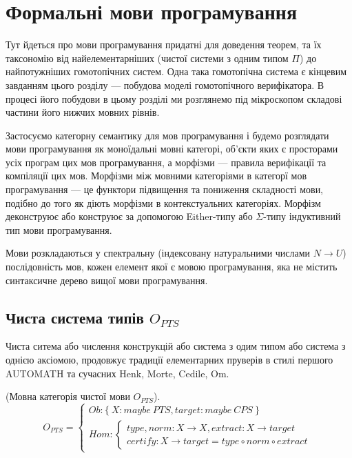 \section{Формальні мови програмування}
Тут йдеться про мови програмування придатні для доведення теорем,
та їх таксономію від найелементарніших (чистої системи з одним типом $\Pi$) до
найпотужніших гомотопічних систем. Одна така гомотопічна система є кінцевим завданням
цього розділу --- побудова моделі гомотопічного верифікатора.
В процесі його побудови в цьому розділі ми розглянемо під
мікроскопом складові частини його нижчих мовних рівнів.

Застосуємо категорну семантику для мов програмування і будемо розглядати
мови програмування як моноїдальні мовні категорі, об'єкти яких є просторами
усіх програм цих мов програмування, а морфізми --- правила верифікації та компіляції цих мов.
Морфізми між мовними категоріями в категорї мов програмування --- це
функтори підвищення та пониження складності мови, подібно до того як діють
морфізми в контекстуальних категоріях. Морфізм деконструює або конструює за
допомогою Either-типу або $\Sigma$-типу індуктивний тип мови програмування.

Мови розкладаються у спектральну (індексовану натуральними числами $N \rightarrow U$)
послідовність мов, кожен елемент якої є мовою програмування,
яка не містить синтаксичне дерево вищої мови програмування.

\subsection{Чиста система типів $O_{PTS}$}

Чиста ситема або числення конструкцій або система з одим типом або
система з однією аксіомою, продовжує традиції елементарних пруверів
в стилі першого AUTOMATH та сучасних Henk, Morte, Cedile, Om.

\begin{definition} (Мовна категорія чистої мови $O_{PTS}$).
\begin{equation}
O_{PTS} =
\begin{cases}
Ob: \{\ X: maybe\ PTS, target: maybe\ CPS \ \} \\
Hom: \begin{cases}
type,norm: X \rightarrow X, extract: X \rightarrow target \\
certify: X \rightarrow target = type \circ norm \circ extract
\end{cases}
\end{cases}
\end{equation}
\end{definition}

